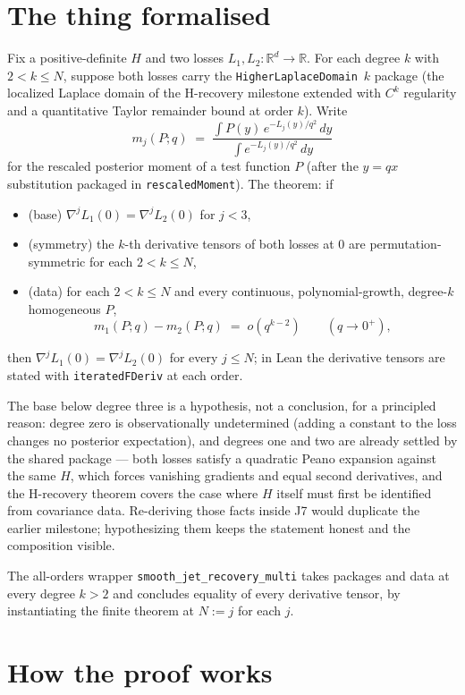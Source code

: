 \documentclass[11pt]{article}
\newcommand{\R}{\mathbb{R}}
\newcommand{\code}[1]{\texttt{#1}}
\begin{document}
\section{The thing formalised}

Fix a positive-definite $H$ and two losses $L_1, L_2 \colon \R^d \to
\R$. For each degree $k$ with $2 < k \le N$, suppose both losses
carry the \code{HigherLaplaceDomain}~$k$ package (the localized
Laplace domain of the H-recovery milestone extended with $C^k$
regularity and a quantitative Taylor remainder bound at order $k$).
Write
\[
  m_j(P; q) \;=\; \frac{\int P(y)\, e^{-L_j(y)/q^2}\, dy}
                      {\int e^{-L_j(y)/q^2}\, dy}
\]
for the rescaled posterior moment of a test function $P$ (after the
$y = qx$ substitution packaged in \code{rescaledMoment}). The theorem:
if
\begin{itemize}
\item (base) $\nabla^j L_1(0) = \nabla^j L_2(0)$ for $j < 3$,
\item (symmetry) the $k$-th derivative tensors of both losses at $0$
  are permutation-symmetric for each $2 < k \le N$,
\item (data) for each $2 < k \le N$ and every continuous,
  polynomial-growth, degree-$k$ homogeneous $P$,
  \[
    m_1(P; q) - m_2(P; q) \;=\; o\!\left(q^{k-2}\right)
    \qquad (q \to 0^+),
  \]
\end{itemize}
then $\nabla^j L_1(0) = \nabla^j L_2(0)$ for every $j \le N$; in
Lean the derivative tensors are stated with \code{iteratedFDeriv}
at each order.

The base below degree three is a hypothesis, not a conclusion, for a
principled reason: degree zero is observationally undetermined
(adding a constant to the loss changes no posterior expectation), and
degrees one and two are already settled by the shared package --- both
losses satisfy a quadratic Peano expansion against the same $H$,
which forces vanishing gradients and equal second derivatives, and
the H-recovery theorem covers the case where $H$ itself must first be
identified from covariance data. Re-deriving those facts inside J7
would duplicate the earlier milestone; hypothesizing them keeps the
statement honest and the composition visible.

The all-orders wrapper \code{smooth\_jet\_recovery\_multi} takes
packages and data at every degree $k > 2$ and concludes equality of
every derivative tensor, by instantiating the finite theorem at
$N := j$ for each $j$.

\section{How the proof works}
\end{document}

